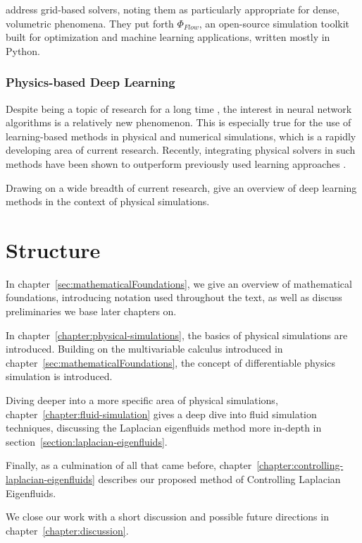\citet{holl2019pdecontrol} address grid-based solvers, noting them as
particularly appropriate for dense, volumetric phenomena. They put forth
$\Phi_{Flow}$, an open-source simulation toolkit built for optimization and
machine learning applications, written mostly in Python.

\subsubsection*{Physics-based Deep Learning}
Despite being a topic of research for a long time \cite{backprop}, the
interest in neural network algorithms is a relatively new phenomenon. This is
especially true for the use of learning-based methods in physical and numerical
simulations, which is a rapidly developing area of current research. Recently,
integrating physical solvers in such methods have been shown to outperform
previously used learning approaches \cite{solver-in-the-loop}.

Drawing on a wide breadth of current research, \citet{pbdl} give an overview of
deep learning methods in the context of physical simulations. 

\section{Structure}
In chapter~\ref{sec:mathematicalFoundations}, we give an overview of
mathematical foundations, introducing notation used throughout the text, as well
as discuss  preliminaries we base later chapters on. 


In chapter~\ref{chapter:physical-simulations}, the basics of physical
simulations are introduced. Building on the multivariable calculus introduced in
chapter~\ref{sec:mathematicalFoundations}, the concept of differentiable physics
simulation is introduced. 

Diving deeper into a more specific area of physical simulations,
chapter~\ref{chapter:fluid-simulation} gives a deep dive into fluid simulation
techniques, discussing the Laplacian eigenfluids method more in-depth in
section~\ref{section:laplacian-eigenfluids}. 

Finally, as a culmination of all that came before,
chapter~\ref{chapter:controlling-laplacian-eigenfluids} describes our proposed
method of Controlling Laplacian Eigenfluids. 

We close our work with a short discussion and possible future directions in
chapter~\ref{chapter:discussion}.
